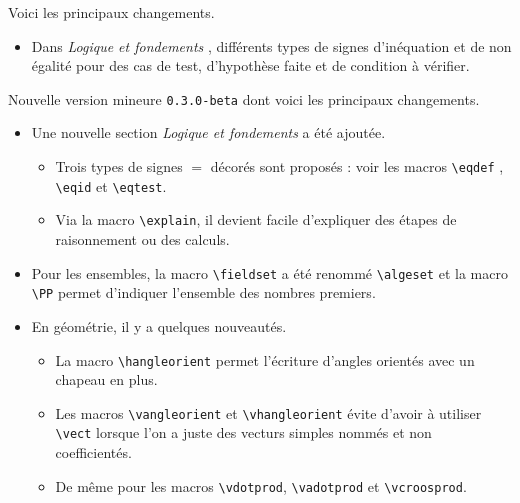 \documentclass[12pt,a4paper]{article}
\theoremstyle{definition}
\begin{document}
\begin{description}[leftmargin=1em]
	\setlength\itemsep{1em}


	\item[2019-09-02] Voici les principaux changements.
	\begin{itemize}
		\item Dans \emph{\og Logique et fondements \fg}, différents types de signes d'inéquation et de non égalité pour des cas de test, d'hypothèse faite et de condition à vérifier.
	\end{itemize}


	\item[2019-07-23] Nouvelle version mineure \verb+0.3.0-beta+ dont voici les principaux changements.
	\begin{itemize}
		\item Une nouvelle section \emph{\og Logique et fondements \fg} a été ajoutée.
		\begin{itemize}
			\item Trois types de signes $=$ décorés sont proposés : voir les macros \verb+\eqdef+ , \verb+\eqid+ et \verb+\eqtest+.

			\item Via la macro \verb+\explain+, il devient facile d'expliquer des étapes de raisonnement ou des calculs.
		\end{itemize}

		\item Pour les ensembles, la macro \verb+\fieldset+ a été renommé \verb+\algeset+ et la macro \verb+\PP+ permet d'indiquer l'ensemble des nombres premiers.

		\item En géométrie, il y a quelques nouveautés.
		\begin{itemize}
			\item La macro \verb+\hangleorient+ permet l'écriture d'angles orientés avec un chapeau en plus.

			\item Les macros \verb+\vangleorient+ et \verb+\vhangleorient+ évite d'avoir à utiliser \verb+\vect+ lorsque l'on a juste des vecturs simples nommés et non coefficientés.

			\item De même pour les macros \verb+\vdotprod+, \verb+\vadotprod+ et \verb+\vcroosprod+.
		\end{itemize}


\end{itemize}
\end{description}
\end{document}

